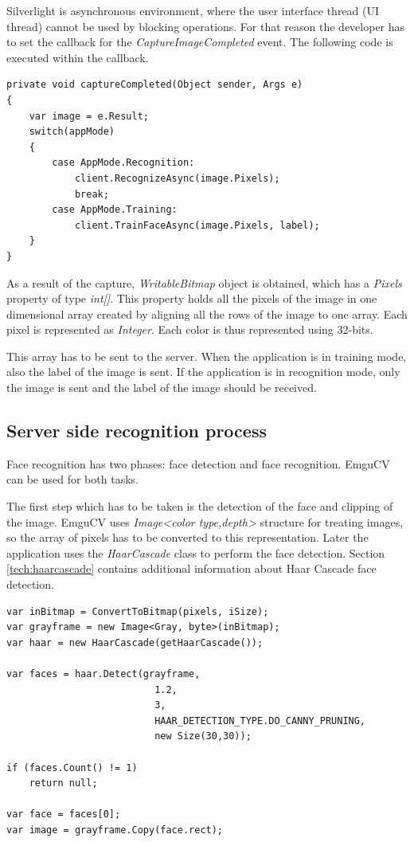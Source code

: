 Silverlight is asynchronous environment, where the user interface thread (UI thread) cannot be used by blocking operations. For that reason the developer has to set the callback for the \textit{CaptureImageCompleted} event. The following code is executed within the callback.

\begin{verbatim}
private void captureCompleted(Object sender, Args e)
{
    var image = e.Result;
    switch(appMode)
    {
        case AppMode.Recognition:
            client.RecognizeAsync(image.Pixels);
            break;
        case AppMode.Training:
            client.TrainFaceAsync(image.Pixels, label);
    }
}
\end{verbatim}

As a result of the capture, \textit{WritableBitmap} object is obtained, which has a \textit{Pixels} property of type \textit{int[]}. This property holds all the pixels of the image in one dimensional array created by aligning all the rows of the image to one array. Each pixel is represented as \textit{Integer}. Each color is thus represented using 32-bits.

This array has to be sent to the server. When the application is in training mode, also the label of the image is sent. If the application is in recognition mode, only the image is sent and the label of the image should be received.

\subsection{Server side recognition process}
Face recognition has two phases: face detection and face recognition. EmguCV can be used for both tasks. 

The first step which has to be taken is the detection of the face and clipping of the image. EmguCV uses \textit{Image<color type,depth>} structure for treating images, so the array of pixels has to be converted to this representation. Later the application uses the \textit{HaarCascade} class to perform the face detection. Section \ref{tech:haarcascade} contains additional information about Haar Cascade face detection.

\begin{verbatim}
var inBitmap = ConvertToBitmap(pixels, iSize);
var grayframe = new Image<Gray, byte>(inBitmap);
var haar = new HaarCascade(getHaarCascade());

var faces = haar.Detect(grayframe,
						  1.2,
						  3,
						  HAAR_DETECTION_TYPE.DO_CANNY_PRUNING,
						  new Size(30,30));
	
if (faces.Count() != 1)
    return null;

var face = faces[0];
var image = grayframe.Copy(face.rect);
\end{verbatim}

